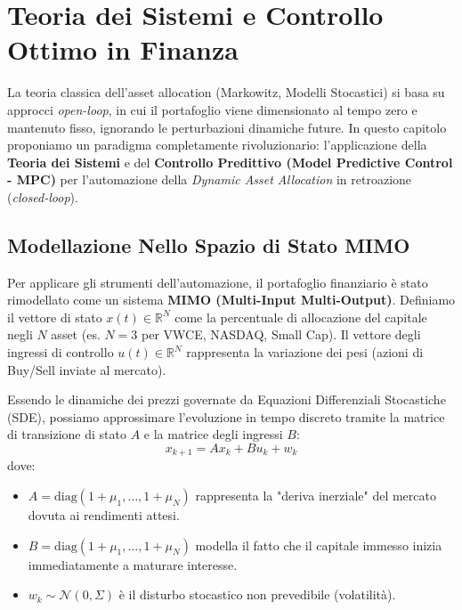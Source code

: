 \chapter{Teoria dei Sistemi e Controllo Ottimo in Finanza}
\label{ch:mpc_finance}

La teoria classica dell'asset allocation (Markowitz, Modelli Stocastici) si basa su approcci \textit{open-loop}, in cui il portafoglio viene dimensionato al tempo zero e mantenuto fisso, ignorando le perturbazioni dinamiche future. In questo capitolo proponiamo un paradigma completamente rivoluzionario: l'applicazione della \textbf{Teoria dei Sistemi} e del \textbf{Controllo Predittivo (Model Predictive Control - MPC)} per l'automazione della \textit{Dynamic Asset Allocation} in retroazione (\textit{closed-loop}).

\section{Modellazione Nello Spazio di Stato MIMO}
Per applicare gli strumenti dell'automazione, il portafoglio finanziario è stato rimodellato come un sistema \textbf{MIMO (Multi-Input Multi-Output)}. 
Definiamo il vettore di stato $x(t) \in \mathbb{R}^N$ come la percentuale di allocazione del capitale negli $N$ asset (es. $N=3$ per VWCE, NASDAQ, Small Cap). Il vettore degli ingressi di controllo $u(t) \in \mathbb{R}^N$ rappresenta la variazione dei pesi (azioni di Buy/Sell inviate al mercato).

Essendo le dinamiche dei prezzi governate da Equazioni Differenziali Stocastiche (SDE), possiamo approssimare l'evoluzione in tempo discreto tramite la matrice di transizione di stato $A$ e la matrice degli ingressi $B$:
\begin{equation}
    x_{k+1} = A x_k + B u_k + w_k
\end{equation}
dove:
\begin{itemize}
    \item $A = \text{diag}(1 + \mu_1, \dots, 1 + \mu_N)$ rappresenta la "deriva inerziale" del mercato dovuta ai rendimenti attesi.
    \item $B = \text{diag}(1 + \mu_1, \dots, 1 + \mu_N)$ modella il fatto che il capitale immesso inizia immediatamente a maturare interesse.
    \item $w_k \sim \mathcal{N}(0, \Sigma)$ è il disturbo stocastico non prevedibile (volatilità).
\end{itemize}

